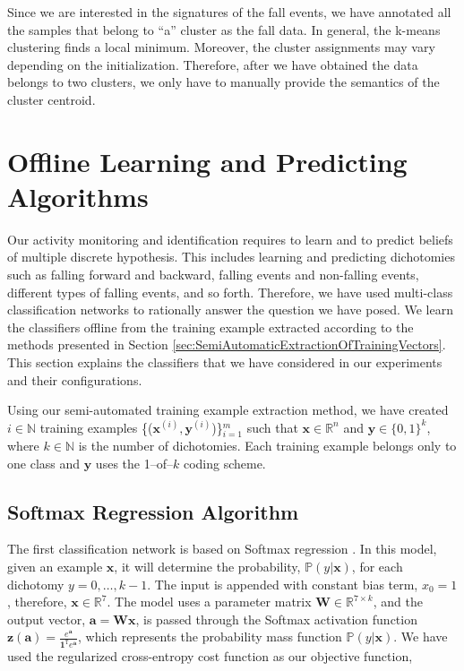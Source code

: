 \documentclass[]{IEEEtran}
\begin{document}
Since we are interested in the signatures of the fall events, we have annotated
all the samples  that belong to ``a'' cluster as the fall data. In general, the
k-means clustering finds a local minimum. Moreover, the cluster assignments may
vary depending on the initialization. Therefore, after we have obtained the
data belongs to two clusters, we only have to manually provide the semantics of
the cluster centroid. 

\section{Offline Learning and Predicting Algorithms}
\label{sec:OffLineLearning}

Our activity monitoring and identification requires to learn and to predict
beliefs of multiple discrete hypothesis. This includes learning and predicting
dichotomies such as falling forward and backward, falling events and
non-falling events, different types of falling events, and so forth.
Therefore, we have used multi-class classification networks to rationally
answer the question we have posed. We learn the classifiers offline from the
training example extracted according to the methods presented in Section
\ref{sec:SemiAutomaticExtractionOfTrainingVectors}. This section explains the
classifiers that we have considered in our experiments and their
configurations. 

Using our semi-automated training example extraction method, we have created $i \in 
\mathbb{N}$ 
training examples 
\{($\mathbf{x}^{(i)}, \mathbf{y}^{(i)}$)\}$_{i=1}^m$ such that $\mathbf{x} \in 
\mathbb{R}^{n}$ 
and 
$\mathbf{y} \in 
\{0,1\}^k$, where  $k \in 
\mathbb{N}$ is the number of dichotomies. Each training example belongs only to one class 
and $\mathbf{y}$ uses the 1--of--$k$ coding scheme.    

\subsection{Softmax Regression Algorithm}
\label{sec:SoftmaxRegrationAlgorthm}

The first classification network is based on Softmax regression
\cite{Bishop:2006:PRM:1162264}. In this model, given an example $\mathbf{x}$, it will
determine the probability, $\mathbb{P}(y | \mathbf{x})$, for each dichotomy
$y=0,\ldots,k-1$. The input is appended with constant bias term, $x_0 = 1$,
therefore, $\mathbf{x} \in \mathbb{R}^7$. The model uses a parameter matrix
$\mathbf{W} \in \mathbb{R}^{7 \times k}$, and the output vector, $\mathbf{a} =
\mathbf{Wx}$, is passed through the Softmax activation function $\mathbf{z(a)}
= \frac{e^{\mathbf{a}}}{\mathbf{1}^\mathtt{T} e^{\mathbf{a}}}$, which
represents the probability mass function $\mathbb{P}(y | \mathbf{x})$. We have
used the regularized cross-entropy cost function as our objective function, 
\end{document}
